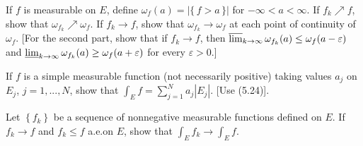 \begin{problem}
  If $f$ is measurable on $E$, define $\omega_f(a)=|\{\,f>a\,\}|$ for
  $-\infty<a<\infty$. If $f_k\nearrow f$, show that
  $\omega_{f_k}\nearrow\omega_f$. If $f_k\to f$, show that
  $\omega_{f_k}\to\omega_f$ at each point of continuity of $\omega_f$. [For
  the second part, show that if $f_k\to f$, then
  $\varlimsup_{k\to\infty}\omega_{f_k}(a)\leq\omega_f(a-\varepsilon)$ and
  $\varliminf_{k\to\infty}\omega_{f_k}(a)\geq\omega_f(a+\varepsilon)$ for
  every $\varepsilon>0$.]
\end{problem}
\begin{solution}
\end{solution}

\begin{problem}
If $f$ is a simple measurable function (not necessarily positive) taking
values $a_j$ on $E_j$, $j=1,...,N$, show that $\int_E f=\sum_{j=1}^N
a_j|E_j|$. [Use (5.24)].
\end{problem}
\begin{solution}
\end{solution}

\begin{problem}
Let $\left\{f_k\right\}$ be a sequence of nonnegative measurable functions
defined on $E$. If $f_k\to f$ and $f_k\leq f$ a.e.\@ on $E$, show that
$\int_E f_k\to\int_E f$.
\end{problem}
\begin{solution}
\end{solution}

